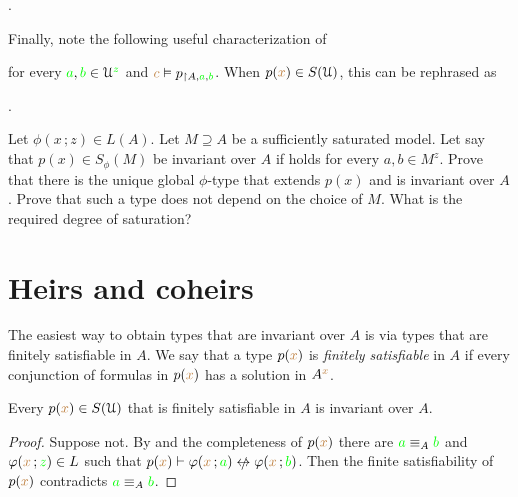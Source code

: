 .

Finally, note the following useful characterization of 


for every ${\color{green} a},{\color{green} b}\in\EuScript U^{\color{green} z}$ and ${\color{brown} c}\vDash p_{\restriction A,{\color{green} a},{\color{green} b}}$.
When $p({\color{brown} x})\in S(\EuScript U)$, this can be rephrased as

.

\begin{exercise}\label{ex_invariant_uniqueness}
  Let $\phi(x\,;z)\in L(A)$. 
  Let $M\supseteq A$ be a sufficiently saturated model.
  Let say that $p(x)\in S_\phi(M)$ be invariant over $A$ if  holds for every $a,b\in M^z$.
  Prove that there is the unique global $\phi$-type that extends $p(x)$ and is invariant over $A$.
  Prove that such a type does not depend on the choice of $M$.
  What is the required degree of saturation?
\end{exercise}

\section{Heirs and coheirs}
\label{coheirs}

\def\medrel#1{\parbox[t]{6ex}{$\displaystyle\hfil #1$}}
\def\ceq#1#2#3{\parbox[t]{16ex}{$\displaystyle #1$}\medrel{#2}{$\displaystyle #3$}}

The easiest way to obtain types that are invariant over $A$ is via types that are finitely satisfiable in $A$.
We say that a type $p({\color{brown} x})$ is \emph{finitely satisfiable\/} in $A$ if every conjunction of formulas in $p({\color{brown} x})$ has a solution in $A^{\color{brown} x}$.

\begin{proposition}\label{prop_coeredi_quasiinvarienti}
  Every $p({\color{brown} x})\in S(\EuScript U)$ that is finitely satisfiable in $A$ is invariant over $A$.
\end{proposition}

\begin{proof}
  Suppose not.
  By  and the completeness of $p({\color{brown} x})$ there are ${\color{green} a}\equiv_A{\color{green} b}$ and $\varphi({\color{brown} x}\,;{\color{green} z})\in L$ such that $p({\mr x})\proves\phi({\mr x}\,;{\gr a})\niff\phi({\mr x}\,;{\gr b})$.
  Then the finite satisfiability of $p({\color{brown} x})$ contradicts ${\color{green} a}\equiv_A{\color{green} b}$.
\end{proof}

